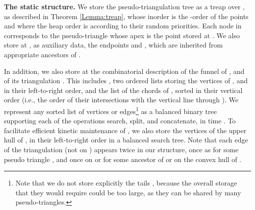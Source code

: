 \documentclass[11pt]{article}
\begin{document}
\medskip
\noindent
{\bf The static structure.}
We store the pseudo-triangulation tree  as a treap over , as
described in Theorem \ref{Lemma:treap}, whose inorder is the -order of the points and where
the heap order is according to their random priorities. Each node  in 
corresponds to the pseudo-triangle  
whose apex is the point stored at . We also store at , as auxiliary data,
the endpoints  and , which are inherited from appropriate ancestors of .

In addition, we also store at  the combinatorial description of the
funnel of , and of its triangulation .  This includes
, two ordered lists storing the vertices of
, and  in their left-to-right order, and the list of
the chords of , sorted in their vertical order (i.e., the order of their intersections
with the vertical line through ).  We
represent any sorted list of vertices or edges\footnote{\small Note that we do not store explicitly the tails , because the overall storage that they would require could be too large, as they can be shared by many pseudo-triangles.} as a balanced
binary tree supporting each of the operations {\sf search}, {\sf split}, and {\sf concatenate},
 in  time \cite{Tarjan}.
To facilitate efficient kinetic maintenance of , we also store
the vertices of the upper hull of , in their left-to-right
order in a balanced search tree. Note that each edge of the triangulation (not on ) appears twice in our structure, once as  for some pseudo triangle , and once on  or  for some ancestor  of  or on the convex hull of .
\end{document}
